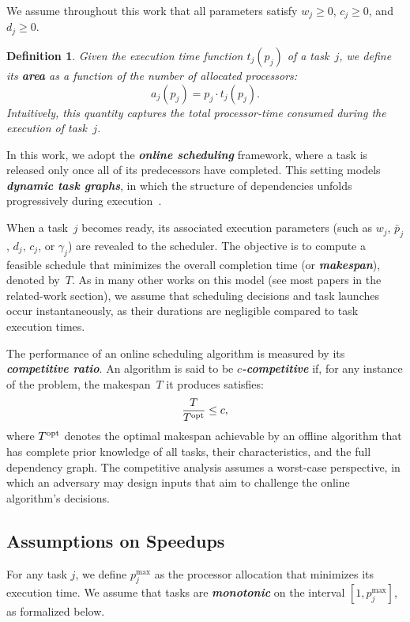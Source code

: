 \documentclass{article}
\newtheorem{definition}{Definition}
\newcommand\opt{\textnormal{opt}\xspace}
\begin{document}
\vspace{0.5em}
We assume throughout this work that all parameters satisfy $w_j \ge 0$, $c_j \ge 0$, and $d_j \ge 0$.


\begin{definition}
Given the execution time function $t_j(p_j)$ of a task~$j$, we define its \textbf{\emph{area}} as a function of the number of allocated processors:
\[
a_j(p_j) = p_j \cdot t_j(p_j).
\]
Intuitively, this quantity captures the total processor-time consumed during the execution of task~$j$.
\end{definition}

In this work, we adopt the \textbf{\emph{online scheduling}} framework, where a task is released only once all of its predecessors have completed. This setting models \textbf{\emph{dynamic task graphs}}, in which the structure of dependencies unfolds progressively during execution~\cite{JOHNSON96_dynamic,Feldmann98_DAG,Agrawal10_dynamic,Canon20_online}. 

When a task~$j$ becomes ready, its associated execution parameters (such as $w_j$, $\bar{p}_j$, $d_j$, $c_j$, or $\gamma_j$) are revealed to the scheduler. The objective is to compute a feasible schedule that minimizes the overall completion time (or \textbf{\emph{makespan}}), denoted by~$T$. As in many other works on this model (see most papers in the related-work section), we assume that scheduling decisions and task launches occur instantaneously, as their durations are negligible compared to task execution times.

The performance of an online scheduling algorithm is measured by its \textbf{\emph{competitive ratio}}. An algorithm is said to be \textbf{\emph{$c$-competitive}} if, for any instance of the problem, the makespan~$T$ it produces satisfies:
\[
\frac{T}{T^{\opt}} \le c,
\]
where $T^{\opt}$ denotes the optimal makespan achievable by an offline algorithm that has complete prior knowledge of all tasks, their characteristics, and the full dependency graph. The competitive analysis assumes a worst-case perspective, in which an adversary may design inputs that aim to challenge the online algorithm’s decisions.

\subsection{Assumptions on Speedups}

For any task $j$, we define $p_j^{\max}$ as the processor allocation that minimizes its execution time.  
We assume that tasks are \textbf{\emph{monotonic}} on the interval $[1, p_j^{\max}]$, as formalized below.
\end{document}
